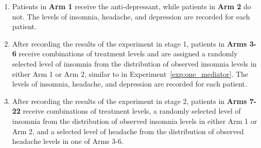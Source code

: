\begin{experiment}\label{exp:two_mediators}
\indent 
\begin{enumerate}[noitemsep,topsep=0pt]
	\item Patients in \textbf{Arm 1} receive the anti-depressant, while patients in \textbf{Arm 2} do not. 
	The levels of insomnia, headache, and depression are recorded for each patient.
	\item After recording the results of the experiment in stage 1, patients in \textbf{Arms 3-6} 
	receive combinations of treatment levels and are assigned a randomly selected level of insomnia 
	from the distribution of observed insomnia levels in either Arm 1 or Arm 2, similar to in 
	Experiment~\ref{exp:one_mediator}. The levels of insomnia, headache, and depression are recorded 
	for each patient.
	\item After recording the results of the experiment in stage 2, patients in \textbf{Arms 7-22} 
	receive combinations of treatment levels, a randomly selected level of insomnia from the distribution of
	observed insomnia levels in either Arm 1 or Arm 2, and a selected level of headache from the 
	distribution of observed headache levels in one of Arms 3-6. 
\end{enumerate}
\end{experiment}

